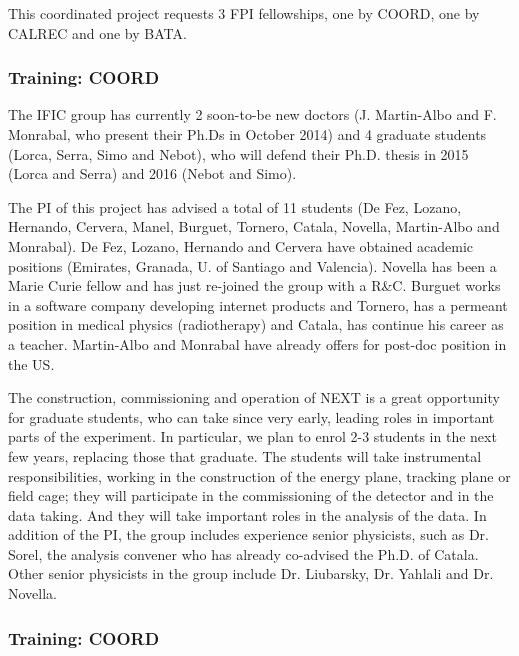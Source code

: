 This coordinated project requests 3 FPI fellowships, one by COORD, one by CALREC and one by BATA.
\subsubsection*{Training: COORD}
The IFIC group has currently 2 soon-to-be new doctors (J. Martin-Albo and F. Monrabal, who present their Ph.Ds in October 2014) and 4 graduate students (Lorca, Serra, Simo and Nebot), who will defend their Ph.D. thesis in 2015 (Lorca and Serra) and 2016 (Nebot and Simo). 

The PI of this project has advised a total of 11 students (De Fez, Lozano, Hernando, Cervera, Manel, Burguet, Tornero, Catala, Novella, Martin-Albo and Monrabal). De Fez, Lozano, Hernando and Cervera have obtained academic positions (Emirates, Granada, U. of Santiago and Valencia). Novella has been a Marie Curie fellow and has just re-joined the group with a R\&C. Burguet works in a software company developing internet products and Tornero, has a permeant position in medical physics (radiotherapy) and Catala, has continue his career as a teacher. Martin-Albo and Monrabal have already offers for post-doc position in the US.

The construction, commissioning and operation of NEXT is a great opportunity for graduate students, who can take since very early, leading roles in important parts of the experiment. In particular, we plan to enrol 2-3 students in the next few years, replacing those that graduate. The students will take instrumental responsibilities, working in the construction of the energy plane, tracking plane or field cage; they will participate in the commissioning of the detector and in the data taking. And they will take important roles in the analysis of the data. In addition of the PI, the group includes experience senior physicists, such as Dr. Sorel, the analysis convener who has already co-advised the Ph.D. of Catala. Other senior physicists in the group include Dr. Liubarsky, Dr. Yahlali and Dr. Novella. 

\subsubsection*{Training: COORD}